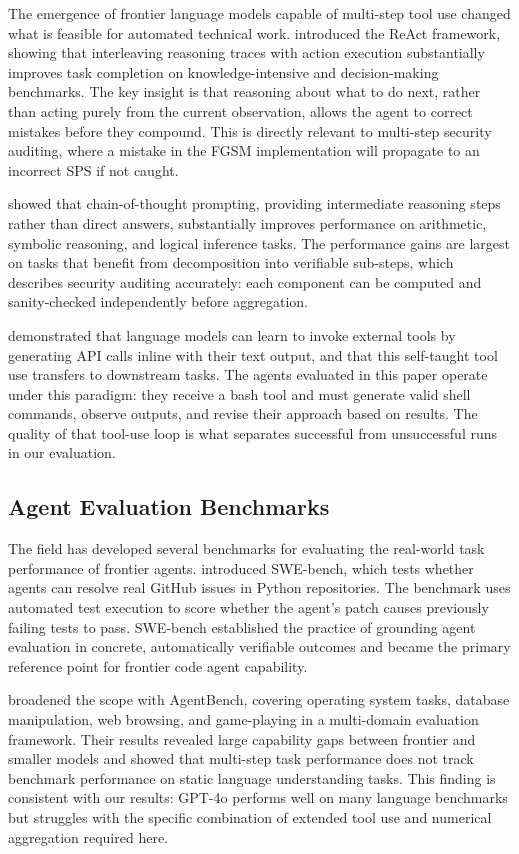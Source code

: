 \documentclass[11pt]{article}
\begin{document}
The emergence of frontier language models capable of multi-step tool use
changed what is feasible for automated technical work.
\citet{yao2023react} introduced the ReAct framework, showing that
interleaving reasoning traces with action execution substantially improves
task completion on knowledge-intensive and decision-making benchmarks.
The key insight is that reasoning about what to do next, rather than acting
purely from the current observation, allows the agent to correct mistakes
before they compound. This is directly relevant to multi-step security
auditing, where a mistake in the FGSM implementation will propagate to an
incorrect SPS if not caught.

\citet{wei2022chain} showed that chain-of-thought prompting, providing
intermediate reasoning steps rather than direct answers, substantially
improves performance on arithmetic, symbolic reasoning, and logical inference
tasks. The performance gains are largest on tasks that benefit from
decomposition into verifiable sub-steps, which describes security auditing
accurately: each component can be computed and sanity-checked independently
before aggregation.

\citet{schick2023toolformer} demonstrated that language models can learn to
invoke external tools by generating API calls inline with their text output,
and that this self-taught tool use transfers to downstream tasks. The agents
evaluated in this paper operate under this paradigm: they receive a bash tool
and must generate valid shell commands, observe outputs, and revise their
approach based on results. The quality of that tool-use loop is what separates
successful from unsuccessful runs in our evaluation.

\subsection{Agent Evaluation Benchmarks}

The field has developed several benchmarks for evaluating the real-world task
performance of frontier agents. \citet{jimenez2024swebench} introduced
SWE-bench, which tests whether agents can resolve real GitHub issues in Python
repositories. The benchmark uses automated test execution to score whether the
agent's patch causes previously failing tests to pass. SWE-bench established
the practice of grounding agent evaluation in concrete, automatically verifiable
outcomes and became the primary reference point for frontier code agent
capability.

\citet{liu2024agentbench} broadened the scope with AgentBench, covering
operating system tasks, database manipulation, web browsing, and game-playing
in a multi-domain evaluation framework. Their results revealed large capability
gaps between frontier and smaller models and showed that multi-step task
performance does not track benchmark performance on static language
understanding tasks. This finding is consistent with our results: GPT-4o
performs well on many language benchmarks but struggles with the specific
combination of extended tool use and numerical aggregation required here.
\end{document}
